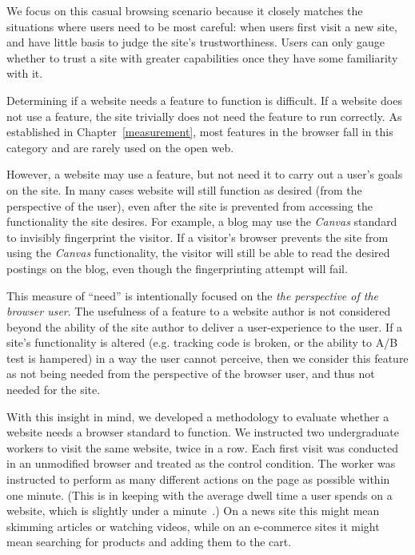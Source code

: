 We focus on this casual browsing scenario because it closely matches the
situations where users need to be most careful: when users first visit a new
site, and have little basis to judge the site's trustworthiness.
Users can only gauge whether to trust a site with greater
capabilities once they have some familiarity with it.

Determining if a website needs a feature to function is difficult.  If a
website does not use a feature, the site trivially does not need the feature to
run correctly.  As established in Chapter~\ref{measurement}, most features in
the browser fall in this category and are rarely used on the open web.

However, a website may use a feature, but not need it to carry out a user's
goals on the site.  In many cases website will still function as desired (from
the perspective of the user), even after the site is prevented from accessing
the functionality the site desires.  For example, a blog may use the
\textit{Canvas} standard to invisibly fingerprint the visitor.  If a visitor's
browser prevents the site from using the \textit{Canvas} functionality, the
visitor will still be able to read the desired postings on the blog, even
though the fingerprinting attempt will fail.

This measure of ``need'' is intentionally focused on the \emph{the perspective
of the browser user}.  The usefulness of a feature to a website author is not
considered beyond the ability of the site author to deliver a user-experience
to the user. If a site's functionality is altered (e.g. tracking code is
broken, or the ability to A/B test is hampered) in a way the user cannot
perceive, then we consider this feature as not being needed from the
perspective of the browser user, and thus not needed for the site.

With this insight in mind, we developed a methodology to evaluate whether a
website needs a browser standard to function. We instructed two undergraduate
workers to visit the same website, twice in a row. Each first visit was
conducted in an unmodified \FF browser and treated as the control condition.
The worker was instructed to perform as many different actions on the page as
possible within one minute. (This is in keeping with the average dwell time a
user spends on a website, which is slightly under a
minute~\cite{liu2010understanding}.) On a news site this might mean skimming
articles or watching videos, while on an e-commerce sites it might mean
searching for products and adding them to the cart.

